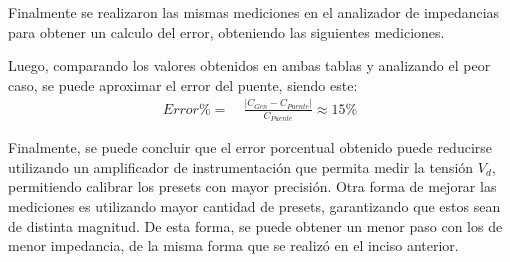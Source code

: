 Finalmente se realizaron las mismas mediciones en el analizador de impedancias para obtener un calculo del error, obteniendo las siguientes mediciones.\\
\begin{table}[H]
\hspace*{-0.75cm}
\caption{Mediciones con el analizador de impedancias.}
\end{table}

Luego, comparando los valores obtenidos en ambas tablas y analizando el peor caso, se puede aproximar el error del puente, siendo este:
\begin{equation*}
\begin{split}
	 Error \% =& \ \frac{|C_{Gen}-C_{Puente}|}{C_{Puente}} \approx 15 \% 
\end{split}
\end{equation*}

Finalmente, se puede concluir que el error porcentual obtenido puede reducirse utilizando un amplificador de instrumentación que permita medir la tensión $V_d$, permitiendo calibrar los presets con mayor precisión. Otra forma de mejorar las mediciones es utilizando mayor cantidad de presets, garantizando que estos sean de distinta magnitud. De esta forma, se puede obtener un menor paso con los de menor impedancia, de la misma forma que se realizó en el inciso anterior.